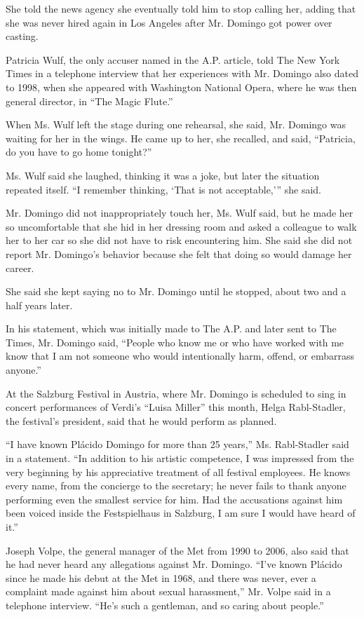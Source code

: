 She told the news agency she eventually told him to stop calling her,
adding that she was never hired again in Los Angeles after Mr. Domingo
got power over casting.

Patricia Wulf, the only accuser named in the A.P. article, told The New
York Times in a telephone interview that her experiences with Mr.
Domingo also dated to 1998, when she appeared with Washington National
Opera, where he was then general director, in ``The Magic Flute.''

When Ms. Wulf left the stage during one rehearsal, she said, Mr. Domingo
was waiting for her in the wings. He came up to her, she recalled, and
said, ``Patricia, do you have to go home tonight?''

Ms. Wulf said she laughed, thinking it was a joke, but later the
situation repeated itself. ``I remember thinking, `That is not
acceptable,''' she said.

Mr. Domingo did not inappropriately touch her, Ms. Wulf said, but he
made her so uncomfortable that she hid in her dressing room and asked a
colleague to walk her to her car so she did not have to risk
encountering him. She said she did not report Mr. Domingo's behavior
because she felt that doing so would damage her career.

She said she kept saying no to Mr. Domingo until he stopped, about two
and a half years later.

In his statement, which was initially made to The A.P. and later sent to
The Times, Mr. Domingo said, ``People who know me or who have worked
with me know that I am not someone who would intentionally harm, offend,
or embarrass anyone.''

At the Salzburg Festival in Austria, where Mr. Domingo is scheduled to
sing in concert performances of Verdi's ``Luisa Miller'' this month,
Helga Rabl-Stadler, the festival's president, said that he would perform
as planned.

``I have known Plácido Domingo for more than 25 years,'' Ms.
Rabl-Stadler said in a statement. ``In addition to his artistic
competence, I was impressed from the very beginning by his appreciative
treatment of all festival employees. He knows every name, from the
concierge to the secretary; he never fails to thank anyone performing
even the smallest service for him. Had the accusations against him been
voiced inside the Festspielhaus in Salzburg, I am sure I would have
heard of it.''

Joseph Volpe, the general manager of the Met from 1990 to 2006, also
said that he had never heard any allegations against Mr. Domingo. ``I've
known Plácido since he made his debut at the Met in 1968, and there was
never, ever a complaint made against him about sexual harassment,'' Mr.
Volpe said in a telephone interview. ``He's such a gentleman, and so
caring about people.''

